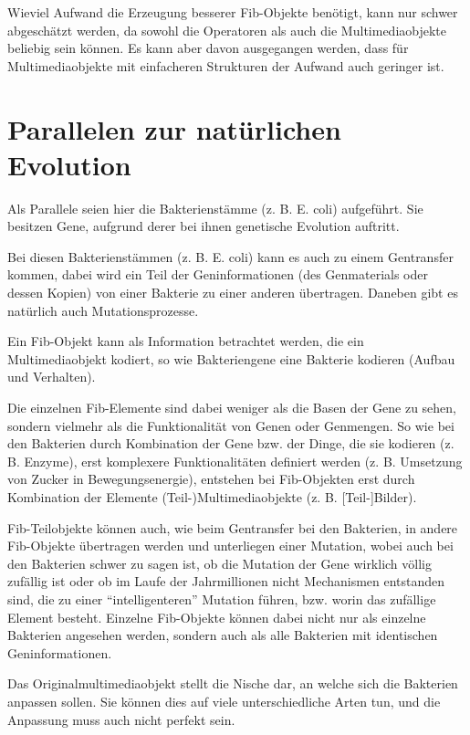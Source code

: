 Wieviel Aufwand die Erzeugung besserer Fib-Objekte benötigt, kann nur schwer abgeschätzt werden, da sowohl die Operatoren als auch die Multimediaobjekte beliebig sein können. Es kann aber davon ausgegangen werden, dass für Multimediaobjekte mit einfacheren Strukturen der Aufwand auch geringer ist.


\section{Parallelen zur natürlichen Evolution}

Als Parallele seien hier die Bakterienstämme (z. B. E. coli) aufgeführt. Sie besitzen Gene, aufgrund derer bei ihnen genetische Evolution auftritt.

Bei diesen Bakterienstämmen (z. B. E. coli) kann es auch zu einem Gentransfer kommen, dabei wird ein Teil der Geninformationen (des Genmaterials oder dessen Kopien) von einer Bakterie zu einer anderen übertragen. Daneben gibt es natürlich auch Mutationsprozesse.

Ein Fib-Objekt kann als Information betrachtet werden, die ein Multimediaobjekt kodiert, so wie Bakteriengene eine Bakterie kodieren (Aufbau und Verhalten).

Die einzelnen Fib-Elemente sind dabei weniger als die Basen der Gene zu sehen, sondern vielmehr als die Funktionalität von Genen oder Genmengen. So wie bei den Bakterien durch Kombination der Gene bzw. der Dinge, die sie kodieren (z. B. Enzyme), erst komplexere Funktionalitäten definiert werden (z. B. Umsetzung von Zucker in Bewegungsenergie), entstehen bei Fib-Objekten erst durch Kombination der Elemente (Teil-)Multimediaobjekte (z. B. [Teil-]Bilder).

Fib-Teilobjekte können auch, wie beim Gentransfer bei den Bakterien, in andere Fib-Objekte übertragen werden und unterliegen einer Mutation, wobei auch bei den Bakterien schwer zu sagen ist, ob die Mutation der Gene wirklich völlig zufällig ist oder ob im Laufe der Jahrmillionen nicht Mechanismen entstanden sind, die zu einer ``intelligenteren'' Mutation führen, bzw. worin das zufällige Element besteht. Einzelne Fib-Objekte können dabei nicht nur als einzelne Bakterien angesehen werden, sondern auch als alle Bakterien mit identischen Geninformationen.

Das Originalmultimediaobjekt stellt die Nische dar, an welche sich die Bakterien anpassen sollen. Sie können dies auf viele unterschiedliche Arten tun, und die Anpassung muss auch nicht perfekt sein.

